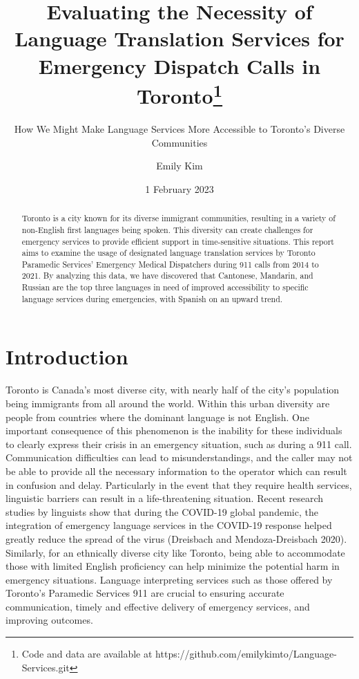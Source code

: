 \documentclass[
  letterpaper,
  DIV=11,
  numbers=noendperiod]{scrartcl}
\title{Evaluating the Necessity of Language Translation Services for
Emergency Dispatch Calls in Toronto\thanks{Code and data are available
at https://github.com/emilykimto/Language-Services.git}}
\subtitle{How We Might Make Language Services More Accessible to
Toronto's Diverse Communities}
\author{Emily Kim}
\date{1 February 2023}
\begin{document}
\maketitle
\begin{abstract}
Toronto is a city known for its diverse immigrant communities, resulting
in a variety of non-English first languages being spoken. This diversity
can create challenges for emergency services to provide efficient
support in time-sensitive situations. This report aims to examine the
usage of designated language translation services by Toronto Paramedic
Services' Emergency Medical Dispatchers during 911 calls from 2014 to
2021. By analyzing this data, we have discovered that Cantonese,
Mandarin, and Russian are the top three languages in need of improved
accessibility to specific language services during emergencies, with
Spanish on an upward trend.
\end{abstract}
\ifdefined\Shaded\renewenvironment{Shaded}{\begin{tcolorbox}[boxrule=0pt, sharp corners, interior hidden, borderline west={3pt}{0pt}{shadecolor}, frame hidden, breakable, enhanced]}{\end{tcolorbox}}\fi

\hypertarget{introduction}{%
\section{Introduction}\label{introduction}}

Toronto is Canada's most diverse city, with nearly half of the city's
population being immigrants from all around the world. Within this urban
diversity are people from countries where the dominant language is not
English. One important consequence of this phenomenon is the inability
for these individuals to clearly express their crisis in an emergency
situation, such as during a 911 call. Communication difficulties can
lead to misunderstandings, and the caller may not be able to provide all
the necessary information to the operator which can result in confusion
and delay. Particularly in the event that they require health services,
linguistic barriers can result in a life-threatening situation. Recent
research studies by linguists show that during the COVID-19 global
pandemic, the integration of emergency language services in the COVID-19
response helped greatly reduce the spread of the virus (Dreisbach and
Mendoza-Dreisbach 2020). Similarly, for an ethnically diverse city like
Toronto, being able to accommodate those with limited English
proficiency can help minimize the potential harm in emergency
situations. Language interpreting services such as those offered by
Toronto's Paramedic Services 911 are crucial to ensuring accurate
communication, timely and effective delivery of emergency services, and
improving outcomes.
\end{document}
